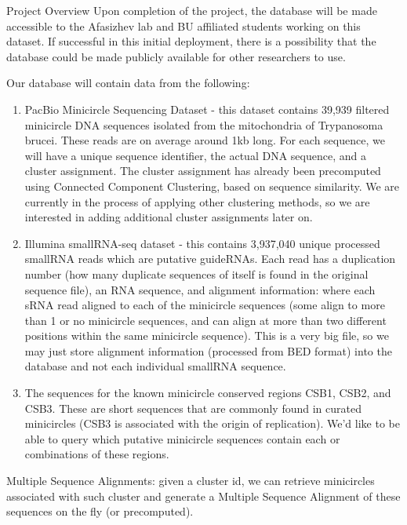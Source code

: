 \documentclass[a4paper,10pt,notitlepage]{article}
\begin{document}
\begin{section}{Project Overview}
Upon completion of the project, the database will be made accessible to the Afasizhev lab and BU affiliated 
students working on this dataset. If successful in this initial deployment, there is a possibility that the 
database could be made publicly available for other researchers to use.


Our database will contain data from the following:

\begin{enumerate}
\item PacBio Minicircle Sequencing Dataset - this dataset contains 39,939 filtered minicircle DNA sequences isolated from the 
mitochondria of Trypanosoma brucei. These reads are on average around 1kb long. For each sequence, we will have a unique sequence 
identifier, the actual DNA sequence, and a cluster assignment. The cluster assignment has already been precomputed using Connected 
Component Clustering, based on sequence similarity. We are currently in the process of applying other clustering methods, 
so we are interested in adding additional cluster assignments later on.
\item Illumina smallRNA-seq dataset - this contains 3,937,040 unique processed smallRNA reads which are putative 
guideRNAs. Each read has a duplication number (how many duplicate sequences of itself is found in the original 
sequence file), an RNA sequence, and alignment information: where each sRNA read aligned to each of the 
minicircle sequences (some align to more than 1 or no minicircle sequences, and can align at more than two 
different positions within the same minicircle sequence). This is a very big file, so we may just store alignment
information (processed from BED format) into the database and not each individual smallRNA sequence.
\item The sequences for the known minicircle conserved regions CSB1, CSB2, and CSB3. These are short sequences that are commonly 
found in curated minicircles (CSB3 is associated with the origin of replication). We’d like to be able to query which putative 
minicircle sequences contain each or combinations of these regions. 
    \end{enumerate}

Multiple Sequence Alignments: given a cluster id, we can retrieve minicircles associated with such cluster and 
generate a Multiple Sequence Alignment of these sequences on the fly (or precomputed).


\end{section}
\end{document}
